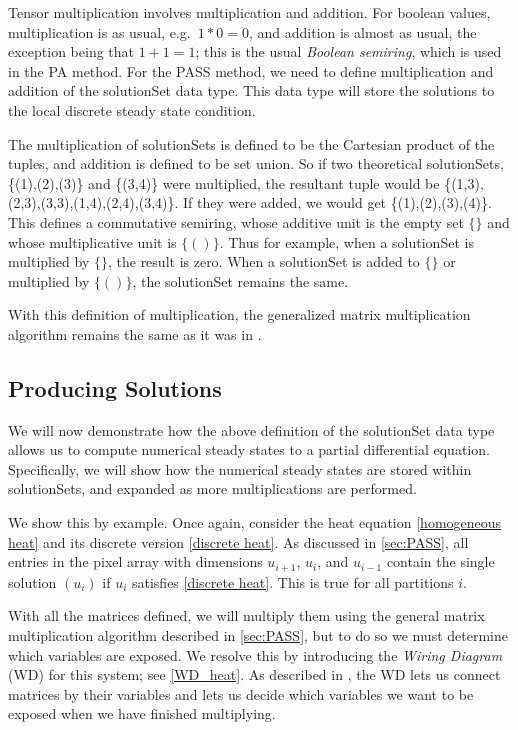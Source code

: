 \documentclass[11pt]{article}
\begin{document}
Tensor multiplication involves multiplication and addition. For boolean values, multiplication is as usual, e.g.\ $1*0=0$, and addition is almost as usual, the exception being that $1+1=1$; this is the usual \emph{Boolean semiring}, which is used in the PA method. For the PASS method, we need to define multiplication and addition of the solutionSet data type. This data type will store the solutions to the local discrete steady state condition.

The multiplication of solutionSets is defined to be the Cartesian product of the tuples, and addition is defined to be set union. So if two theoretical solutionSets, \{(1),(2),(3)\} and \{(3,4)\} were multiplied, the resultant tuple would be \{(1,3),(2,3),(3,3),(1,4),(2,4),(3,4)\}. If they were added, we would get \{(1),(2),(3),(4)\}. This defines a commutative semiring, whose additive unit is the empty set $\{\}$ and whose multiplicative unit is $\{()\}$. Thus for example, when a solutionSet is multiplied by $\{\}$, the result is zero. When a solutionSet is added to $\{\}$ or multiplied by $\{()\}$, the solutionSet remains the same.

With this definition of multiplication, the generalized matrix multiplication algorithm remains the same as it was in \citep{Introduction_to_PA}.

\subsection{Producing Solutions}

We will now demonstrate how the above definition of the solutionSet data type allows us to compute numerical steady states to a partial differential equation. Specifically, we will show how the numerical steady states are stored within solutionSets, and expanded as more multiplications are performed. 

We show this by example. Once again, consider the heat equation \eqref{homogeneous heat} and its discrete version \eqref{discrete heat}. As discussed in \cref{sec:PASS}, all entries in the pixel array with dimensions $u_{i+1}$, $u_i$, and $u_{i-1}$ contain the single solution ${(u_i)}$ if $u_i$ satisfies \cref{discrete heat}. This is true for all partitions $i$.

With all the matrices defined, we will multiply them using the general matrix multiplication algorithm described in \cref{sec:PASS}, but to do so we must determine which variables are exposed. We resolve this by introducing the \textit{Wiring Diagram} (WD) for this system; see \cref{WD_heat}. As described in \citep{Introduction_to_PA}, the WD lets us connect matrices by their variables and lets us decide which variables we want to be exposed when we have finished multiplying.
\end{document}

